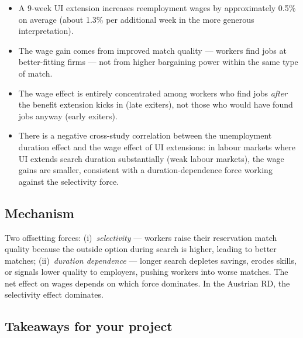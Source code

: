 \documentclass[12pt]{article}
\begin{document}
\begin{itemize}
    \item A 9-week UI extension increases reemployment wages by approximately 0.5\% on average (about 1.3\% per additional week in the more generous interpretation).
    \item The wage gain comes from improved match quality --- workers find jobs at better-fitting firms --- not from higher bargaining power within the same type of match.
    \item The wage effect is entirely concentrated among workers who find jobs \emph{after} the benefit extension kicks in (late exiters), not those who would have found jobs anyway (early exiters).
    \item There is a negative cross-study correlation between the unemployment duration effect and the wage effect of UI extensions: in labour markets where UI extends search duration substantially (weak labour markets), the wage gains are smaller, consistent with a duration-dependence force working against the selectivity force.
\end{itemize}

\subsection*{Mechanism}

Two offsetting forces: (i)~\emph{selectivity} --- workers raise their reservation match quality because the outside option during search is higher, leading to better matches; (ii)~\emph{duration dependence} --- longer search depletes savings, erodes skills, or signals lower quality to employers, pushing workers into worse matches. The net effect on wages depends on which force dominates. In the Austrian RD, the selectivity effect dominates.

\subsection*{Takeaways for your project}
\end{document}
